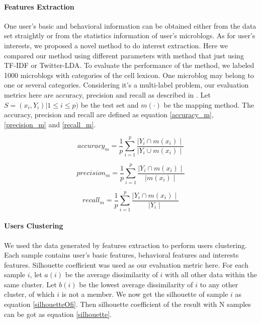\paragraph{Features Extraction}
One user's basic and behavioral information can be obtained either from the data set straightly or from the statistics information of user's microblogs. As for user's interests, we proposed a novel method to do interest extraction. Here we compared our method using different parameters with method that just using TF-IDF or Twitter-LDA. To evaluate the performance of the method, we labeled 1000 microblogs with categories of the cell lexicon. One microblog may belong to one or several categories. Considering it's a multi-label problem, our evaluation metrics here are accuracy, precision and recall as described in \cite{IEEEexample:journals/tkde/ZhangZ14}. Let $S = {(x_i,Y_i)| 1 \le i \le p)}$ be the test set and $m(\cdot)$ be the mapping method. The accuracy, precision and recall are defined as equation \eqref{accuracy_m}, \eqref{precision_m} and \eqref{recall_m}.\par

\begin{equation}\label{accuracy_m}
accuracy_m = \frac{1}{p} \sum_{i=1}^{p} \frac{\mid Y_i \cap m(x_i) \mid}{\mid Y_i \cup m(x_i) \mid}
\end{equation}

\begin{equation}\label{precision_m}
precision_m = \frac{1}{p} \sum_{i=1}^{p} \frac{\mid Y_i \cap m(x_i) \mid}{\mid m(x_i) \mid}
\end{equation}

\begin{equation}\label{recall_m}
recall_m = \frac{1}{p} \sum_{i=1}^{p} \frac{\mid Y_i \cap m(x_i) \mid}{\mid Y_i \mid}
\end{equation}

\paragraph{Users Clustering}
We used the data generated by features extraction to perform users clustering. Each sample contains user's basic features, behavioral features and interests features. Silhouette coefficient \cite{IEEEexample:books/mk/HanKP2011} was used as our evaluation metric here. For each sample $i$, let $a(i)$ be the average dissimilarity of $i$ with all other data within the same cluster. Let $b(i)$ be the lowest average dissimilarity of $i$ to any other cluster, of which $i$ is not a member. We now get the silhouette of sample $i$ as equation \eqref{silhouetteOfi}. Then silhouette coefficient of the result with N samples can be got as equation \eqref{silhouette}.\par

